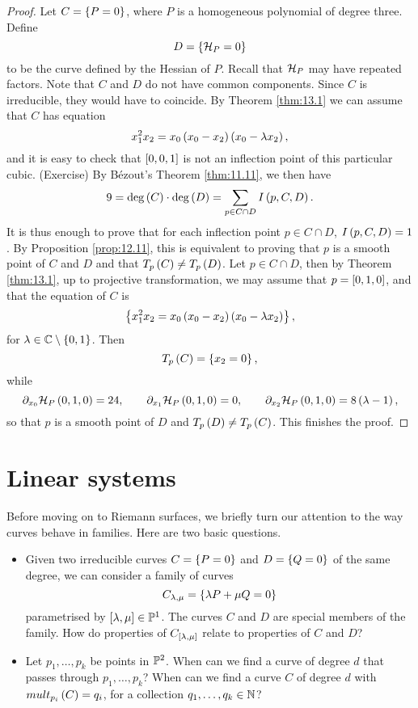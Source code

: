 \begin{proof}
Let $ C = \cb{P = 0} $, where $ P $ is a homogeneous polynomial of degree three. Define
$$ D = \cb{\HH_P = 0} $$
to be the curve defined by the Hessian of $ P $. Recall that $ \HH_P $ may have repeated factors. Note that $ C $ and $ D $ do not have common components. Since $ C $ is irreducible, they would have to coincide. By Theorem \ref{thm:13.1} we can assume that $ C $ has equation
$$ x_1^2x_2 = x_0\rb{x_0 - x_2}\rb{x_0 - \lambda x_2}, $$
and it is easy to check that $ \sb{0, 0, 1} $ is not an inflection point of this particular cubic. (Exercise) By B\'ezout's Theorem \ref{thm:11.11}, we then have
$$ 9 = \deg\rb{C} \cdot \deg\rb{D} = \sum_{p \in C \cap D} I\rb{p, C, D}. $$
It is thus enough to prove that for each inflection point $ p \in C \cap D $, $ I\rb{p, C, D} = 1 $. By Proposition \ref{prop:12.11}, this is equivalent to proving that $ p $ is a smooth point of $ C $ and $ D $ and that $ T_p\rb{C} \ne T_p\rb{D} $. Let $ p \in C \cap D $, then by Theorem \ref{thm:13.1}, up to projective transformation, we may assume that $ p = \sb{0, 1, 0} $, and that the equation of $ C $ is
$$ \cb{x_1^2x_2 = x_0\rb{x_0 - x_2}\rb{x_0 - \lambda x_2}}, $$
for $ \lambda \in \C \setminus \cb{0, 1} $. Then
$$ T_p\rb{C} = \cb{x_2 = 0}, $$
while
$$ \partial_{x_0}\HH_P\rb{0, 1, 0} = 24, \qquad \partial_{x_1}\HH_P\rb{0, 1, 0} = 0, \qquad \partial_{x_2}\HH_P\rb{0, 1, 0} = 8\rb{\lambda - 1}, $$
so that $ p $ is a smooth point of $ D $ and $ T_p\rb{D} \ne T_p\rb{C} $. This finishes the proof.
\end{proof}

\pagebreak

\section{Linear systems}

Before moving on to Riemann surfaces, we briefly turn our attention to the way curves behave in families. Here are two basic questions.
\begin{itemize}
\item Given two irreducible curves $ C = \cb{P = 0} $ and $ D = \cb{Q = 0} $ of the same degree, we can consider a family of curves
$$ C_{\lambda, \mu} = \cb{\lambda P + \mu Q = 0} $$
parametrised by $ \sb{\lambda, \mu} \in \P^1 $. The curves $ C $ and $ D $ are special members of the family. How do properties of $ C_{\sb{\lambda, \mu}} $ relate to properties of $ C $ and $ D $?
\item Let $ p_1, \dots, p_k $ be points in $ \P^2 $. When can we find a curve of degree $ d $ that passes through $ p_1, \dots, p_k $? When can we find a curve $ C $ of degree $ d $ with $ mult_{p_i}\rb{C} = q_i $, for a collection $ q_1, \dots, q_k \in \N $?
\end{itemize}

